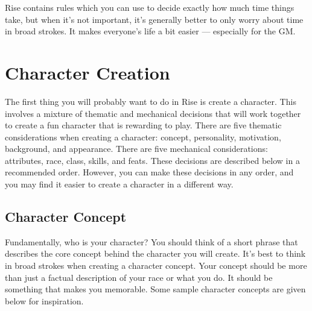             Rise contains rules which you can use to decide exactly how much time things take, but when it's not important, it's generally better to only worry about time in broad strokes.
            It makes everyone's life a bit easier --- especially for the GM\@.

\section{Character Creation}

    The first thing you will probably want to do in Rise is create a character.
    This involves a mixture of thematic and mechanical decisions that will work together to create a fun character that is rewarding to play.
    There are five thematic considerations when creating a character: concept, personality, motivation, background, and appearance.
    There are five mechanical considerations: attributes, race, class, skills, and feats.
    These decisions are described below in a recommended order.
    However, you can make these decisions in any order, and you may find it easier to create a character in a different way.  

    \subsection{Character Concept}

        Fundamentally, who is your character?
        You should think of a short phrase that describes the core concept behind the character you will create.
        It's best to think in broad strokes when creating a character concept.
        Your concept should be more than just a factual description of your race or what you do.
        It should be something that makes you memorable.
        Some sample character concepts are given below for inspiration.

